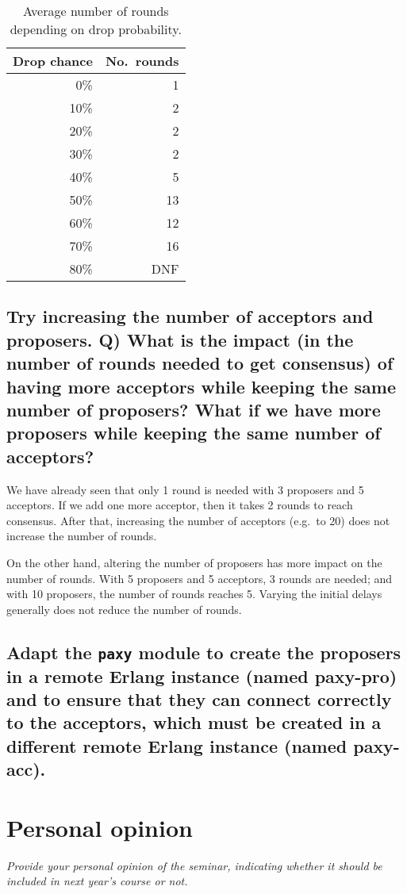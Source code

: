 \documentclass[a4paper, 10pt]{article}
\begin{document}
\begin{table}[htp]
\centering
\caption{Average number of rounds depending on drop probability.}
\label{tab:drop-chance}
\begin{tabular}{rr}
\toprule
Drop chance\! & No.~rounds   \\ \midrule
0\%           & 1                 \\
10\%          & 2                 \\
20\%          & 2                 \\
30\%          & 2                 \\
40\%          & 5                 \\
50\%          & 13                \\
60\%          & 12                \\
70\%          & 16                \\
80\%          & DNF               \\ \bottomrule
\end{tabular}
\end{table}

\subsection{\!Try increasing the number of acceptors and proposers. Q) What is the impact (in the number of rounds needed to get consensus) of having more acceptors while keeping the same number of proposers? What if we have more proposers while keeping the same number of acceptors?}

We have already seen that only 1 round is needed with 3 proposers and 5 acceptors.
If we add one more acceptor, then it takes 2 rounds to reach consensus.
After that, increasing the number of acceptors (e.g.~to 20) does not increase the number of rounds.

On the other hand, altering the number of proposers has more impact on the number of rounds.
With 5 proposers and 5 acceptors, 3 rounds are needed; and with 10 proposers, the number of rounds reaches 5.
Varying the initial delays generally does not reduce the number of rounds.

\subsection{Adapt the \texttt{paxy} module to create the proposers in a remote Erlang instance (named paxy-pro) and to ensure that they can connect correctly to the
acceptors, which must be created in a different remote Erlang instance (named
paxy-acc).}

\section{Personal opinion}

\textit{Provide your personal opinion of the seminar, indicating whether it should be included in next year's course or not.}
\end{document}

